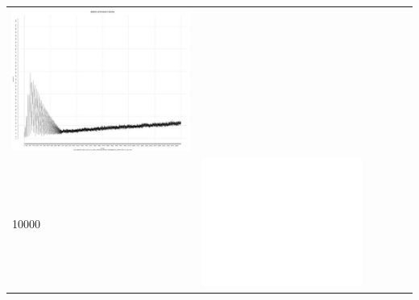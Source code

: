 \begin{table}[htbp]
{\begin{tabular}{l | ccccc}
\begin{minipage}{.15\textwidth}
     			 	\includegraphics[width=\linewidth]{images/mema-graph/I13}
    				 \end{minipage}\\
		10000  &	 \begin{minipage}{.15\textwidth}
     			 	\includegraphics[width=\linewidth]{images/mema-graph/I5}
    				 \end{minipage}
    			   &	 \begin{minipage}{.15\textwidth}

\end{minipage}
\end{tabular}}
\end{table}
